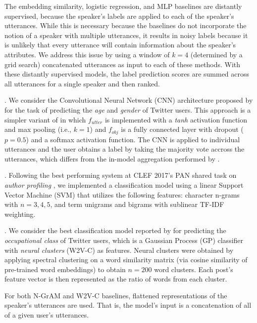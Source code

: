 \vspace{8pt}The embedding similarity, logistic regression, and MLP baselines are distantly supervised, because the speaker's labels are applied to each of the speaker's utterances. While this is necessary because the baselines do not incorporate the notion of a speaker with multiple utterances, it results in noisy labels because it is unlikely that every utterance will contain information about the speaker's attributes.
We address this issue by using a window of $k = 4$ (determined by a grid search) concatenated utterances as input to each of these methods. With these distantly supervised models, the label prediction scores are summed across all utterances for a single speaker and then ranked.

 \cite{bayot:MOD17}. We consider the Convolutional Neural Network (CNN) architecture proposed by \citeauthor{bayot:MOD17} for the task of predicting the \textit{age} and \textit{gender} of Twitter users. This approach is a simpler variant of  in which $f_{utter}$ is implemented with a \emph{tanh} activation function and max pooling (i.e., $k=1$) and $f_{obj}$ is a fully connected layer with dropout ($p=0.5$) and a softmax activation function.
The CNN is applied to individual utterances and the user obtains a label by taking the majority vote accross the utterances, which differs from the in-model aggregation performed by .

 \cite{basile:2017}. Following the best performing system at CLEF 2017's PAN shared task on \textit{author profiling} \cite{stein:2017o}, we implemented a classification model using a linear Support Vector Machine (SVM) \cite{cortes1995support} that utilizes the following features: character n-grams with $n=3,4,5$, and term unigrams and bigrams with sublinear TF-IDF weighting.

. We consider the best classification model reported by \citet{pietro:ACL15} for predicting the \textit{occupational class} of Twitter users, which is a Gaussian Process (GP) classifier \cite{chu2005gaussian} with \textit{neural clusters} (W2V-C) as features. Neural clusters were obtained by applying spectral clustering on a word similarity matrix (via cosine similarity of pre-trained word embeddings) to obtain $n=200$ word clusters. Each post's feature vector is then represented as the ratio of words from each cluster.

\vspace{8pt}For both N-GrAM and W2V-C baselines, flattened representations of the speaker's utterances are used. That is, the model's input is a concatenation of all of a given user's utterances.

